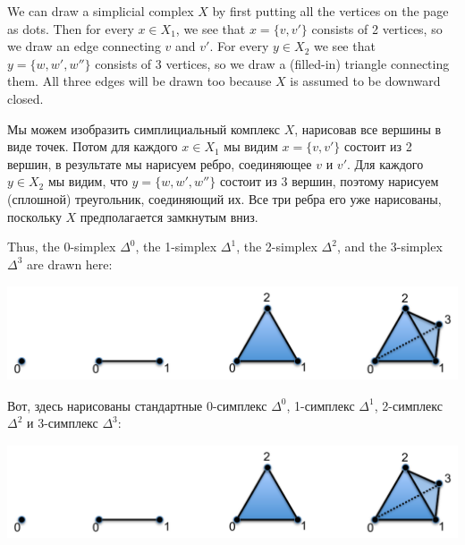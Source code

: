 \documentclass[CT4S-EN-RU]{subfiles}
\begin{document}
\begin{blockENG}
We can draw a simplicial complex $X$ by first putting all the vertices on the page as dots. Then for every $x\in X_1$, we see that $x=\{v,v'\}$ consists of 2 vertices, so we draw an edge connecting $v$ and $v'$. For every $y\in X_2$ we see that $y=\{w,w',w''\}$ consists of 3 vertices, so we draw a (filled-in) triangle connecting them. All three edges will be drawn too because $X$ is assumed to be downward closed.
\end{blockENG}

\begin{blockRUS}
Мы можем изобразить симплициальный комплекс $X$, нарисовав все вершины в виде точек. Потом для каждого $x\in X_1$ мы видим $x=\{v,v'\}$ состоит из 2 вершин, в результате мы нарисуем ребро, соединяющее $v$ и $v'$. Для каждого $y\in X_2$ мы видим, что $y=\{w,w',w''\}$ состоит из 3 вершин, поэтому нарисуем (сплошной) треугольник, соединяющий их. Все три ребра его уже нарисованы, поскольку $X$ предполагается замкнутым вниз.
\end{blockRUS}

\begin{blockENG}
Thus, the 0-simplex $\Delta^0$, the 1-simplex $\Delta^1$, the 2-simplex $\Delta^2$, and the 3-simplex $\Delta^3$ are drawn here:
\begin{center}
\includegraphics[height=1.1in]{simplices}
\end{center} 
\end{blockENG}

\begin{blockRUS}
Вот, здесь нарисованы стандартные 0-симплекс $\Delta^0$, 1-симплекс $\Delta^1$, 2-симплекс $\Delta^2$ и 3-симплекс $\Delta^3$:
\begin{center}
\includegraphics[height=1.1in]{simplices}
\end{center} 
\end{blockRUS}
\end{document}
